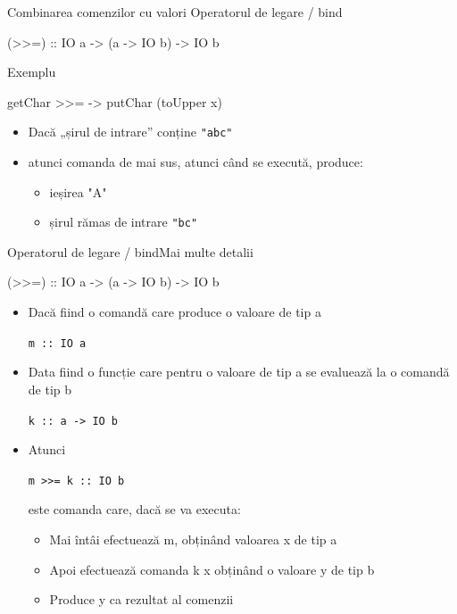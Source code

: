 \documentclass[xcolor=pdftex,romanian,colorlinks]{beamer}
\begin{document}
\begin{frame}[fragile]{Combinarea comenzilor cu valori}
{Operatorul de legare / bind}
\begin{asciihs}
   (>>=) :: IO a -> (a -> IO b) -> IO b
\end{asciihs}
\begin{block}{Exemplu}
\begin{asciihs}
   getChar >>= \x -> putChar (toUpper x)
\end{asciihs}
\begin{itemize}
\item Dacă „șirul de intrare” conține \lstinline$"abc"$
\item atunci comanda de mai sus, atunci când se execută, produce:
\begin{itemize}
\item ieșirea "A"
\item șirul rămas de intrare \lstinline$"bc"$
\end{itemize}
\end{itemize}
\end{block}
\end{frame}

\begin{frame}[fragile]{Operatorul de legare / bind}{Mai multe detalii}
\begin{asciihs}
     (>>=) :: IO a -> (a -> IO b) -> IO b
\end{asciihs}

\begin{itemize}
\item Dacă fiind o comandă care produce o valoare de tip a

\lstinline$m :: IO a$
\item Data fiind o funcție care pentru o valoare de tip a se evaluează la o comandă de tip b

\lstinline$k :: a -> IO b$
\item Atunci 

\lstinline$m >>= k :: IO b$

este comanda care, dacă se va executa:
\begin{itemize}
\item Mai întâi efectuează m, obținând valoarea x de tip a
\item Apoi efectuează comanda k x obținând o valoare y de tip b
\item Produce y ca rezultat al comenzii
\end{itemize}
\end{itemize}
\end{frame}
\end{document}
